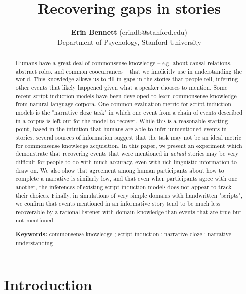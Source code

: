 \documentclass[10pt,a4paper]{article}
\title{Recovering gaps in stories}
\author{{\large \bf Erin Bennett} (erindb@stanford.edu) \\ %
  Department of Psychology, Stanford University}
\begin{document}
\maketitle


\begin{abstract}

Humans have a great deal of commonsense knowledge -- e.g. about causal relations, abstract roles, and common coocurrances -- that we implicitly use in understanding the world.
This knowledge allows us to fill in gaps in the stories that people tell, inferring other events that likely happened given what a speaker chooses to mention.
Some recent script induction models have been developed to learn commonsense knowledge from natural language corpora.
One common evaluation metric for script induction models is the "narrative cloze task" in which one event from a chain of events described in a corpus is left out for the model to recover.
While this is a reasonable starting point, based in the intuition that humans are able to infer unmentioned events in stories, several sources of information suggest that the task may not be an ideal metric for commonsense knowledge acquisition.
In this paper, we present an experiment which demonstrate that recovering events that were mentioned in {\em actual} stories may be very difficult for people to do with much accuracy, even with rich linguistic information to draw on.
We also show that agreement among human participants about how to complete a narrative is similarly low, and that even when participants agree with one another, the inferences of existing script induction models does not appear to track their choices.
Finally, in simulations of very simple domains with handwritten "scripts", we confirm that events mentioned in an informative story tend to be much less recoverable by a rational listener with domain knowledge than events that are true but not mentioned.

\textbf{Keywords:} 
commonsense knowledge ; script induction ; narrative cloze ; narrative understanding
\end{abstract}

\section{Introduction}
\end{document}
